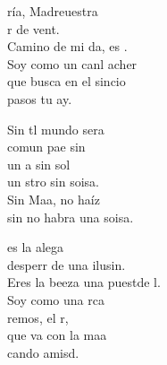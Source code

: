 \begin{cancion}%
	ría, Madreuestra\\
	r de vent.\\
	Camino de mi da,  es . \\
	Soy como un canl acher\\
	que busca en el sincio\\
	 pasos  tu ay. \\
	\begin{chorus}%
	Sin tl mundo sera\\
	comun pae sin \\
	un a sin sol\\
	un stro sin soisa.\\
	Sin Maa, no haíz\\
	sin no habra una soisa.\\
	\end{chorus}%
	es la alega \\
	desperr de una ilusin.\\
	Eres la beeza una puestde l.\\
	Soy como una rca\\
	 remos,  el r,\\
	que va con la maa\\
	cando  amisd.\\
\end{cancion}%
